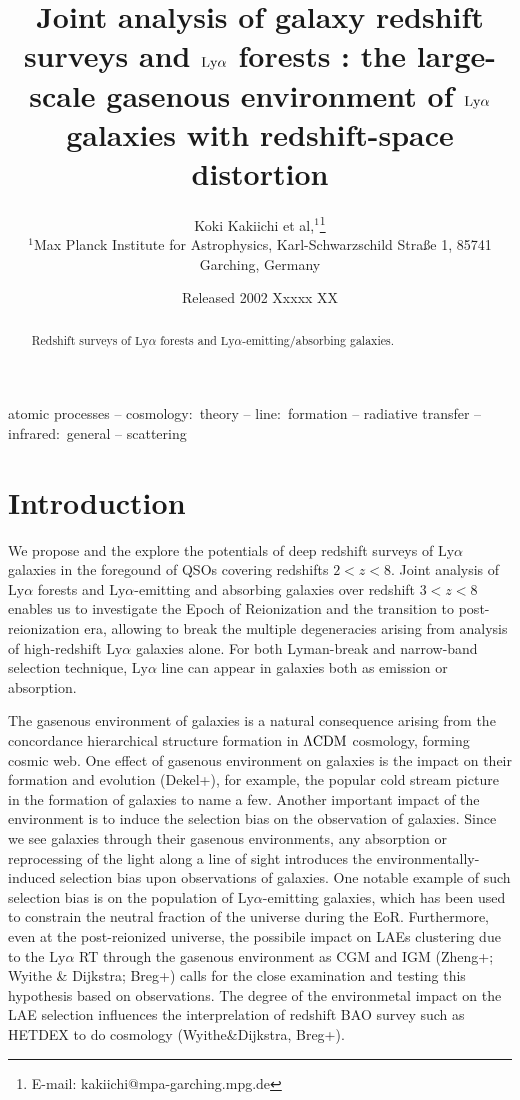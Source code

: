 \documentclass[useAMS,usenatbib,twocolumn]{mn2e}
\title[$\LyA$ forests and $\LyA$ galaxy surveys]
  {Joint analysis of galaxy redshift surveys and $\LyA$ forests \Rmnum{1}: \newline
  the large-scale gasenous environment of $\LyA$ galaxies 
  with redshift-space distortion}
\author[K. Kakiichi et al.]
{Koki Kakiichi et al,$^{1}$\thanks{E-mail: kakiichi@mpa-garching.mpg.de}
\\
$^1$Max Planck Institute for Astrophysics, Karl-Schwarzschild Stra\ss e 1, 85741 Garching, Germany
}
\date{Released 2002 Xxxxx XX}
\newcommand{\LyA}{\mbox{Ly}\alpha}
\begin{document}
\maketitle

\begin{abstract}
Redshift surveys of $\LyA$ forests and $\LyA$-emitting/absorbing galaxies. 
\end{abstract}

\begin{keywords}
atomic processes -- cosmology:\ theory -- line:\ formation -- radiative
transfer -- infrared:\ general -- scattering
\end{keywords}

\section{Introduction}
We propose and the explore the potentials of deep redshift surveys
of $\LyA$ galaxies in the foregound of QSOs covering redshifts $2<z<8$.
Joint analysis of $\LyA$ forests and $\LyA$-emitting and absorbing galaxies
over redshift $3<z<8$ enables us to investigate the Epoch of Reionization
and the transition to post-reionization era, allowing to break the multiple 
degeneracies arising from analysis of high-redshift $\LyA$ galaxies alone.
For both Lyman-break and narrow-band selection technique, $\LyA$ line can 
appear in galaxies both as emission or absorption.

The gasenous environment of galaxies is a natural consequence arising from 
the concordance hierarchical structure formation in $\rm{\Lambda CDM}$
cosmology, forming cosmic web. One effect of gasenous environment on
galaxies is the impact on their formation and evolution (Dekel+),
for example, the popular cold stream picture in the formation of galaxies 
to name a few. Another important impact of the environment is to induce
the selection bias on the observation of galaxies. Since we see galaxies
through their gasenous environments, any absorption or reprocessing of the light
along a line of sight introduces the environmentally-induced selection bias 
upon observations of galaxies. One notable example of such selection bias is 
on the population of $\LyA$-emitting galaxies, which has been used to 
constrain the neutral fraction of the universe during the EoR. 
Furthermore, even at the post-reionized universe, the possibile impact 
on LAEs clustering due to the $\LyA$ RT through the gasenous environment 
as CGM and IGM (Zheng+; Wyithe \& Dijkstra; Breg+) calls for the close 
examination and testing this hypothesis based on observations. The degree of 
the environmetal impact on the LAE selection influences the interprelation of 
redshift BAO survey such as HETDEX to do cosmology (Wyithe\&Dijkstra, Breg+). 
 
\end{document}
